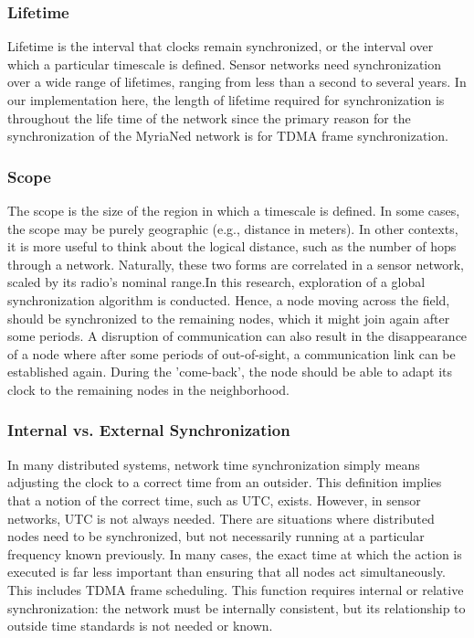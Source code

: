 \documentclass[a4paper,10pt]{report}
\begin{document}
\subsubsection{\textbf{Lifetime}} Lifetime is the interval that clocks
remain synchronized, or the interval over which a particular
timescale is defined. Sensor networks need synchronization over a
wide range of lifetimes, ranging from less than a second to several
years. In our implementation here, the length of lifetime required
for synchronization is throughout the life time of the network since
the primary reason for the synchronization of the MyriaNed network is for TDMA frame
synchronization.
\subsubsection{\textbf{Scope}} The scope is the size of the region in
which a timescale is defined. In some cases, the scope may be purely
geographic (e.g., distance in meters). In other contexts, it is more
useful to think about the logical distance, such as the number of
hops through a network. Naturally, these two forms are correlated in
a sensor network, scaled by its radio's nominal range.\newline In
this research, exploration of a global synchronization algorithm is
conducted. Hence, a node moving across the field, should be
synchronized to the remaining nodes, which it might join again after
some periods. A disruption of communication can also result in the
disappearance of a node where after some periods of out-of-sight, a
communication link can be established again. During the 'come-back',
the node should be able to adapt its clock to the remaining nodes in
the neighborhood.
\subsubsection{\textbf{Internal vs. External Synchronization}}
In many distributed systems, network time synchronization simply
means adjusting the clock to a correct time from an outsider. This
definition implies that a notion of the correct time, such as UTC,
exists. However, in sensor networks, UTC is not always needed. There
are situations where distributed nodes need to be synchronized, but
not necessarily running at a particular frequency known previously.
In many cases, the exact time at which the action is executed is far
less important than ensuring that all nodes act simultaneously. This
includes TDMA frame scheduling. This function requires internal or
relative synchronization: the network must be internally consistent,
but its relationship to outside time standards is not needed or
known.
\end{document}
